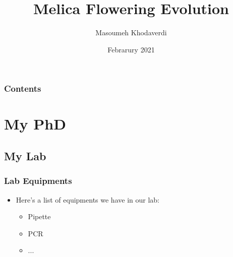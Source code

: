 \documentclass[12pt]{beamer}\usepackage[]{graphicx}\usepackage[]{color}
\title[Short title]{Melica Flowering Evolution} %
\author{Masoumeh Khodaverdi} %
\institute[UVM] %
{
University of Vermont \\ %
Department of Plant Biology \\
Burlington, VT 05401 USA \\ 
\medskip
\textit{mkhodave@uvm.edu} %
}
\date{Febrarury 2021} %
\begin{document}
\begin{frame}
\titlepage %
\end{frame}


\begin{frame}
\frametitle{Contents} %
\tableofcontents %
\end{frame}

\section{My PhD} %

\subsection{My Lab} %

\begin{frame}
\frametitle{Lab Equipments}
\begin{itemize}
\item Here's a list of equipments we have in our lab:
\begin{itemize}
\item Pipette
\item PCR
\item ...
\end{itemize}
\end{itemize}
\end{frame}
\end{document}
